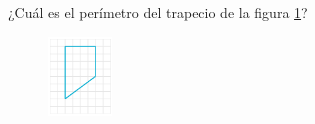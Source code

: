 ¿Cuál es el perímetro del trapecio de la figura \ref{fig:peri_trap_02}?

\begin{figure}[H]
    \centering
    \includegraphics[width=0.15\textwidth]{../images/peri_trap_02.png}
    \caption{}
    \label{fig:peri_trap_02}
\end{figure}

